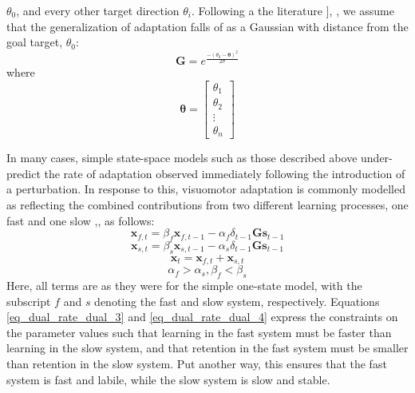 \documentclass[man, 11pt, longtable, floatsintext, notab]{apa6}
\begin{document}
$\theta_{0}$, and every other target direction $\theta_{i}$.
Following a the literature \cite{brayanov_motor_2012}],
\cite{poggio_generalization_2004}, we assume that the
generalization of adaptation falls of as a Gaussian with
distance from the goal target, $\theta_{0}$:
\begin{equation}
  \boldsymbol{G} = e^{\frac{-(\theta_{0} - \boldsymbol{\theta})^2}{2 \sigma}}
\end{equation}
where
\begin{equation}
\boldsymbol{\theta} = \begin{bmatrix} \theta_1 \\ \theta_2 \\ \vdots \\ \theta_n \end{bmatrix}
\end{equation}

In many cases, simple state-space models such as those
described above under-predict the rate of adaptation
observed immediately following the introduction of a
perturbation. In response to this, visuomotor adaptation is
commonly modelled as reflecting the combined contributions
from two different learning processes, one fast and one slow
\cite{smith_interacting_2006},\cite{mcdougle_taking_2016},
as follows:
\begin{equation}
  \boldsymbol{x}_{f, t} = \beta_{f} \boldsymbol{x}_{f,
    t-1} - \alpha_{f} \delta_{t-1} \boldsymbol{G} \boldsymbol{s}_{t-1}
  \label{eq_dual_rate_dual_1}
\end{equation}
\begin{equation}
    \boldsymbol{x}_{s, t} = \beta_{s} \boldsymbol{x}_{s,
      t-1} - \alpha_{s} \delta_{t-1} \boldsymbol{G} \boldsymbol{s}_{t-1}
    \label{eq_dual_rate_dual_2}
\end{equation}
\begin{equation}
  \boldsymbol{x}_{t} = \boldsymbol{x}_{f, t} + \boldsymbol{x}_{s, t}
  \label{eq_dual_rate_dual_3}
\end{equation}
\begin{equation}
  \alpha_{f} > \alpha_{s}, \beta_{f} < \beta_{s}
  \label{eq_dual_rate_dual_4}
\end{equation}
Here, all terms are as they were for the simple one-state
model, with the subscript $f$ and $s$ denoting the fast and
slow system, respectively. Equations
\ref{eq_dual_rate_dual_3} and \ref{eq_dual_rate_dual_4}
express the constraints on the parameter values such that
learning in the fast system must be faster than learning in
the slow system, and that retention in the fast system must
be smaller than retention in the slow system. Put another
way, this ensures that the fast system is fast and labile,
while the slow system is slow and stable.
\end{document}
